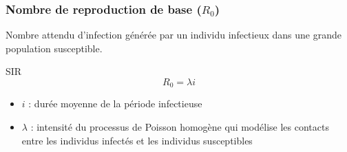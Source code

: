 \begin{frame}
        \frametitle{Nombre de reproduction de base ($R_0$)}

        Nombre attendu d’infection générée par un individu infectieux dans une grande population susceptible.

        \begin{alertblock}{SIR}
                $$ R_0 =  \lambda i $$
        \end{alertblock}

        \begin{itemize}
                \item $i$ : durée moyenne de la période infectieuse
                \item $\lambda$ : intensité du processus de Poisson homogène qui modélise les contacts entre les individus infectés et les individus susceptibles
        \end{itemize}
\end{frame}
